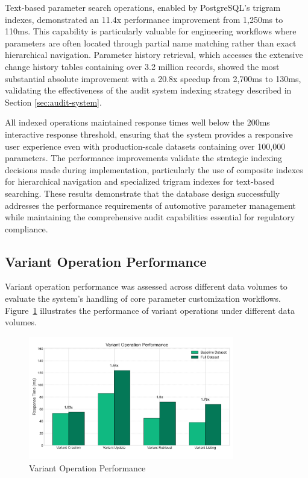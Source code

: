 Text-based parameter search operations, enabled by PostgreSQL's trigram indexes, demonstrated an 11.4x performance improvement from 1,250ms to 110ms. This capability is particularly valuable for engineering workflows where parameters are often located through partial name matching rather than exact hierarchical navigation. Parameter history retrieval, which accesses the extensive change history tables containing over 3.2 million records, showed the most substantial absolute improvement with a 20.8x speedup from 2,700ms to 130ms, validating the effectiveness of the audit system indexing strategy described in Section \ref{sec:audit-system}.

All indexed operations maintained response times well below the 200ms interactive response threshold, ensuring that the system provides a responsive user experience even with production-scale datasets containing over 100,000 parameters. The performance improvements validate the strategic indexing decisions made during implementation, particularly the use of composite indexes for hierarchical navigation and specialized trigram indexes for text-based searching. These results demonstrate that the database design successfully addresses the performance requirements of automotive parameter management while maintaining the comprehensive audit capabilities essential for regulatory compliance.

\subsection{Variant Operation Performance}
\label{subsec:variant-operation-performance}

Variant operation performance was assessed across different data volumes to evaluate the system's handling of core parameter customization workflows. Figure~\ref{fig:variant-performance} illustrates the performance of variant operations under different data volumes.

\begin{figure}[h]
    \centering
    \includegraphics[width=0.8\textwidth]{figures/variant_performance.png}
    \caption{Variant Operation Performance}
    \label{fig:variant-performance}
\end{figure}

